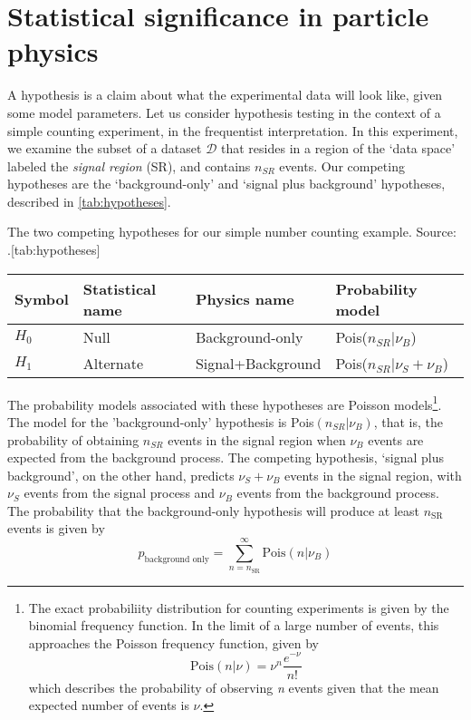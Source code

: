 \section{Statistical significance in particle physics}
A hypothesis is a claim about what the experimental data will look like, given some model parameters. Let us consider hypothesis testing in the context of a simple counting experiment, in the frequentist interpretation. In this experiment, we examine the subset of a dataset $\mathcal{D}$ that resides in a region of the `data space' labeled the \emph{signal region} (SR), and contains $n_{SR}$ events. Our competing hypotheses are the `background-only' and `signal plus background' hypotheses, described in \autoref{tab:hypotheses}. 
\begin{table}
  \begin{sidecaption}{The two competing hypotheses for our simple number counting example. Source: \cite{Cranmer2015}.}[tab:hypotheses]
  \begin{tabular}{llll}
    \toprule
    Symbol & Statistical name & Physics name & Probability model\\
    \midrule
    $H_0$ & Null & Background-only & Pois($n_{SR}|\nu_B$)\\
    $H_1$ & Alternate & Signal+Background & Pois($n_{SR}|\nu_S+\nu_B$)\\
    \bottomrule
  \end{tabular}
\end{sidecaption}
\end{table}
The probability models associated with these hypotheses are Poisson models\footnote{The exact probabiliity distribution for counting experiments is given by the binomial frequency function. In the limit of a large number of events, this approaches the Poisson frequency function, given by
  \[\text{Pois}(n|\nu) = \nu^n\frac{e^{-\nu}}{n!}\]
  which describes the probability of observing \emph{n} events given that the mean expected number of events is $\nu$.
}. The model for the 'background-only' hypothesis is Pois$(n_{SR}|\nu_B)$, that is, the probability of obtaining $n_{SR}$ events in the signal region when $\nu_B$ events are expected from the background process. The competing hypothesis, `signal plus background', on the other hand, predicts $\nu_S+\nu_B$ events in the signal region, with $\nu_S$ events from the signal process and $\nu_B$ events from the background process. The probability that the background-only hypothesis will produce at least $n_\text{SR}$ events is given by
\[p_\text{background only} = \sum_{n=n_\text{SR}}^\infty \text{Pois}(n|\nu_B)\]

